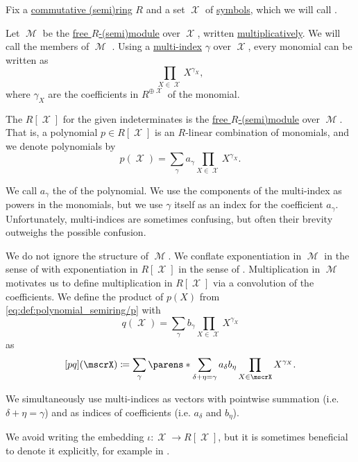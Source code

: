 \begin{definition}\label{def:polynomial_semiring}
  Fix a \hyperref[def:semiring/commutative]{commutative (semi)ring} \( R \) and a set \( \mscrX \) of \hyperref[def:formal_language/symbol]{symbols}, which we will call .

  Let \( \mscrM \) be the \hyperref[def:free_semimodule]{free \( R \)-(semi)module} over \( \mscrX \), written \hyperref[rem:additive_magma]{multiplicatively}. We will call the members of \( \mscrM \) . Using a \hyperref[def:multi_index]{multi-index} \( \gamma \) over \( \mscrX \), every monomial can be written as
  \begin{equation*}
    \prod_{X \in \mscrX} X^{\gamma_X},
  \end{equation*}
  where \( \gamma_X \) are the coefficients in \( R^{\oplus \mscrX} \) of the monomial.

  The  \( R[\mscrX] \) for the given indeterminates is the \hyperref[def:free_semimodule]{free \( R \)-(semi)module} over \( \mscrM \). That is, a polynomial \( p \in R[\mscrX] \) is an \( R \)-linear combination of monomials, and we denote polynomials by
  \begin{equation}\label{eq:def:polynomial_semiring/p}
    p(\mscrX) = \sum_\gamma a_\gamma \prod_{X \in \mscrX} X^{\gamma_X}.
  \end{equation}

  We call \( a_\gamma \) the  of the polynomial. We use the components of the multi-index as powers in the monomials, but we use \( \gamma \) itself as an index for the coefficient \( a_\gamma \). Unfortunately, multi-indices are sometimes confusing, but often their brevity outweighs the possible confusion.

  We do not ignore the structure of \( \mscrM \). We conflate exponentiation in \( \mscrM \) in the sense of  with exponentiation in \( R[\mscrX] \) in the sense of . Multiplication in \( \mscrM \) motivates us to define multiplication in \( R[\mscrX] \) via a convolution of the coefficients. We define the product of \( p(X) \) from \eqref{eq:def:polynomial_semiring/p} with
  \begin{equation}\label{eq:def:polynomial_semiring/q}
    q(\mscrX) = \sum_\gamma b_\gamma \prod_{X \in \mscrX} X^{\gamma_X}
  \end{equation}
  as
  \begin{equation}\label{eq:def:polynomial_semiring/pq}
    [pq](\mscrX) \coloneqq \sum_\gamma \parens*{ \sum_{\delta + \eta = \gamma} a_\delta b_\eta } \prod_{X \in \mscrX} X^{\gamma_X}.
  \end{equation}

  We simultaneously use multi-indices as vectors with pointwise summation (i.e. \( \delta + \eta = \gamma \)) and as indices of coefficients (i.e. \( a_\delta \) and \( b_\eta \)).

  We avoid writing the embedding \( \iota: \mscrX \to R[\mscrX] \), but it is sometimes beneficial to denote it explicitly, for example in .
\end{definition}

